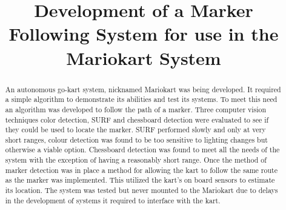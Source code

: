 \title{Development of a Marker Following System for use in the Mariokart System}

\author{

  \vspace{0.5\baselineskip}


  \vspace{0.5\baselineskip}


  \vspace{0.5\baselineskip}

}

\maketitle

\begin{abstract}
  An autonomous go-kart system, nicknamed Mariokart was being developed. It required a simple algorithm to demonstrate its abilities and test its systems. To meet this need an algorithm was developed to follow the path of a marker. Three computer vision techniques color detection, SURF and chessboard detection were evaluated to see if they could be used to locate the marker. SURF performed slowly and only at very short ranges, colour detection was found to be too sensitive to lighting changes but otherwise a viable option. Chessboard detection was found to meet all the needs of the system with the exception of having a reasonably short range. Once the method of marker detection was in place a method for allowing the kart to follow the same route as the marker was implemented. This utilized the kart’s on board sensors to estimate its location. The system was tested but never mounted to the Mariokart due to delays in the development of systems it required to interface with the kart.
\end{abstract}
